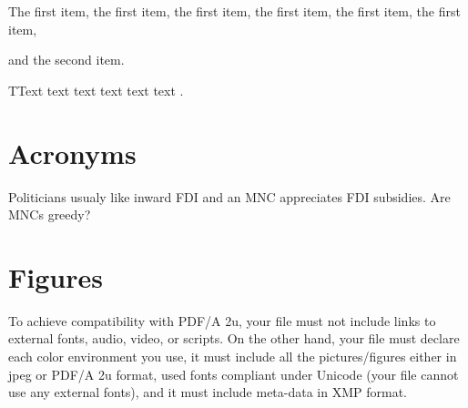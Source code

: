 \begin{lista}
	\item The first item, the first item, the first item, the first item, the first item, the first item, 
	\item and the second item.
\end{lista}

TText text text text text text \citet{Blomstrom2003}. 

\section{Acronyms}

Politicians usualy like inward \ac{FDI} and an \ac{MNC} appreciates \ac{FDI} subsidies. Are \acp{MNC} greedy?

\section{Figures}

To achieve compatibility with PDF/A 2u, your file must not include links to external fonts, audio, video, or scripts. On the other hand, your file must declare each color environment you use, it must include all the pictures/figures either in jpeg or PDF/A 2u format, used fonts compliant under Unicode (your file cannot use any external fonts), and it must include meta-data in XMP format.


